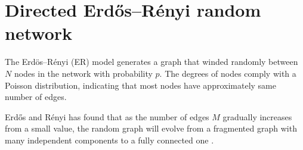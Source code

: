 \section{Directed Erdős–Rényi random network}
The Erdös–Rényi (ER) model generates a graph that winded randomly between $N$ nodes in the network with probability $p$. The degrees of nodes comply with a Poisson distribution, indicating that most nodes have approximately same number of edges.

Erdős and Rényi has found that as the number of edges $M$ gradually increases from a small value, the random graph will evolve from a fragmented graph with many independent components to a fully connected one \cite{strogatz2001exploring}.

